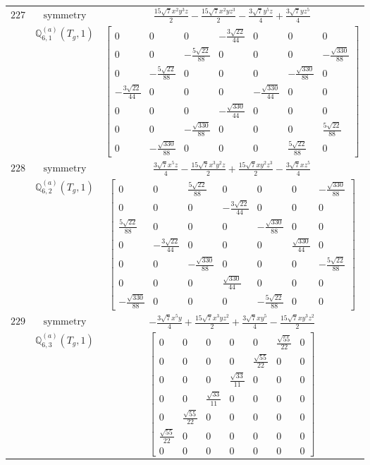 \documentclass[fleqn,8pt,landscape]{jsarticle}
\begin{document}
\begin{longtable}{ccc}
$ 227 $ & $ \text{symmetry} $ & $ \frac{15 \sqrt{7} x^{2} y^{3} z}{2} - \frac{15 \sqrt{7} x^{2} y z^{3}}{2} - \frac{3 \sqrt{7} y^{5} z}{4} + \frac{3 \sqrt{7} y z^{5}}{4} $ \\
$  $ & $ \mathbb{Q}_{6,1}^{(a)}(T_{g},1) $ & $ \begin{bmatrix} 0 & 0 & 0 & - \frac{3 \sqrt{22}}{44} & 0 & 0 & 0 \\ 0 & 0 & - \frac{5 \sqrt{22}}{88} & 0 & 0 & 0 & - \frac{\sqrt{330}}{88} \\ 0 & - \frac{5 \sqrt{22}}{88} & 0 & 0 & 0 & - \frac{\sqrt{330}}{88} & 0 \\ - \frac{3 \sqrt{22}}{44} & 0 & 0 & 0 & - \frac{\sqrt{330}}{44} & 0 & 0 \\ 0 & 0 & 0 & - \frac{\sqrt{330}}{44} & 0 & 0 & 0 \\ 0 & 0 & - \frac{\sqrt{330}}{88} & 0 & 0 & 0 & \frac{5 \sqrt{22}}{88} \\ 0 & - \frac{\sqrt{330}}{88} & 0 & 0 & 0 & \frac{5 \sqrt{22}}{88} & 0 \end{bmatrix} $ \\ \hline
$ 228 $ & $ \text{symmetry} $ & $ \frac{3 \sqrt{7} x^{5} z}{4} - \frac{15 \sqrt{7} x^{3} y^{2} z}{2} + \frac{15 \sqrt{7} x y^{2} z^{3}}{2} - \frac{3 \sqrt{7} x z^{5}}{4} $ \\
$  $ & $ \mathbb{Q}_{6,2}^{(a)}(T_{g},1) $ & $ \begin{bmatrix} 0 & 0 & \frac{5 \sqrt{22}}{88} & 0 & 0 & 0 & - \frac{\sqrt{330}}{88} \\ 0 & 0 & 0 & - \frac{3 \sqrt{22}}{44} & 0 & 0 & 0 \\ \frac{5 \sqrt{22}}{88} & 0 & 0 & 0 & - \frac{\sqrt{330}}{88} & 0 & 0 \\ 0 & - \frac{3 \sqrt{22}}{44} & 0 & 0 & 0 & \frac{\sqrt{330}}{44} & 0 \\ 0 & 0 & - \frac{\sqrt{330}}{88} & 0 & 0 & 0 & - \frac{5 \sqrt{22}}{88} \\ 0 & 0 & 0 & \frac{\sqrt{330}}{44} & 0 & 0 & 0 \\ - \frac{\sqrt{330}}{88} & 0 & 0 & 0 & - \frac{5 \sqrt{22}}{88} & 0 & 0 \end{bmatrix} $ \\ \hline
$ 229 $ & $ \text{symmetry} $ & $ - \frac{3 \sqrt{7} x^{5} y}{4} + \frac{15 \sqrt{7} x^{3} y z^{2}}{2} + \frac{3 \sqrt{7} x y^{5}}{4} - \frac{15 \sqrt{7} x y^{3} z^{2}}{2} $ \\
$  $ & $ \mathbb{Q}_{6,3}^{(a)}(T_{g},1) $ & $ \begin{bmatrix} 0 & 0 & 0 & 0 & 0 & \frac{\sqrt{55}}{22} & 0 \\ 0 & 0 & 0 & 0 & \frac{\sqrt{55}}{22} & 0 & 0 \\ 0 & 0 & 0 & \frac{\sqrt{33}}{11} & 0 & 0 & 0 \\ 0 & 0 & \frac{\sqrt{33}}{11} & 0 & 0 & 0 & 0 \\ 0 & \frac{\sqrt{55}}{22} & 0 & 0 & 0 & 0 & 0 \\ \frac{\sqrt{55}}{22} & 0 & 0 & 0 & 0 & 0 & 0 \\ 0 & 0 & 0 & 0 & 0 & 0 & 0 \end{bmatrix} $ \\ \hline

\end{longtable}
\end{document}
